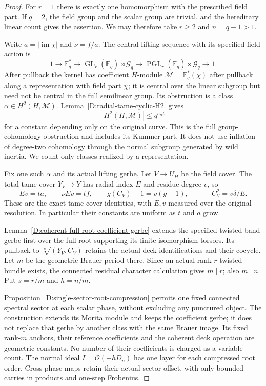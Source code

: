 \begin{proof}
For $r=1$ there is exactly one homomorphism with the prescribed
field part. If $q=2$, the field group and the scalar group are
trivial, and the hereditary linear count gives the assertion.
We may therefore take $r\geq2$ and $n=q-1>1$.

Write $a=|\operatorname{im}\chi|$ and $\nu=f/a$.
The central lifting sequence with its specified field action is
\[
 1\longrightarrow\mathbb F_q^*
 \longrightarrow\operatorname{GL}_r(\mathbb F_q)\rtimes\mathcal G_q
 \longrightarrow\operatorname{PGL}_r(\mathbb F_q)\rtimes\mathcal G_q
 \longrightarrow1.                                    \tag{D.PS.2}
\]
After pullback the kernel has coefficient $H$-module
$\mathcal M=\mathbb F_q^*(\chi)$ after pullback along a
representation with field part $\chi$; it is central over
the linear subgroup but need not be central in the full
semilinear group. Its obstruction is a class
$\alpha\in H^2(H,\mathcal M)$.
Lemma~\ref{D:radial-tame-cyclic-H2} gives
\[
                  |H^2(H,\mathcal M)|\leq q^{c_Rt}      \tag{D.PS.3}
\]
for a constant depending only on the original curve.
This is the full group-cohomology obstruction and includes
its Kummer part. It does not use inflation of degree-two
cohomology through the normal subgroup generated by wild
inertia. We count only classes realized by a representation.

Fix one such $\alpha$ and its actual lifting gerbe.
Let $V\to U_H$ be the field cover. The total tame cover
$Y_V\to Y$ has radial index $E$ and residue degree $v$,
so
\[
 Ev=ta,\qquad \nu Ev=tf,\qquad
 g(C_V)-1=v(g-1),\qquad -C_V^2=v\delta/E.               \tag{D.PS.4}
\]
These are the exact tame cover identities, with $E,v$
measured over the original resolution. In particular
their constants are uniform as $t$ and $a$ grow.

Lemma~\ref{D:coherent-full-root-coefficient-gerbe} extends
the specified twisted-band gerbe first over the full root
supporting its finite isomorphism torsors. Its pullback to
$\sqrt[n]{(Y_V,C_V)}$ retains the actual deck identifications
and their cocycle. Let $m$ be the geometric Brauer period
there. Since an actual rank-$r$ twisted bundle exists,
the connected residual character calculation gives $m\mid r$;
also $m\mid n$. Put $s=r/m$ and $h=n/m$.

Proposition~\ref{D:single-sector-root-compression} permits
one fixed connected spectral sector at each scalar phase,
without excluding any punctured object. The construction
extends its Morita module and keeps the coefficient gerbe;
it does not replace that gerbe by another class with the
same Brauer image. Its fixed rank-$m$ anchors, their
reference coefficients and the coherent deck operation
are geometric constants. No number of their coefficients
is charged as a variable count. The normal ideal
$I=\mathcal O(-hD_n)$ has one layer for each compressed
root order. Cross-phase maps retain their actual sector
offset, with only bounded carries in products and
one-step Frobenius.


\end{proof}
